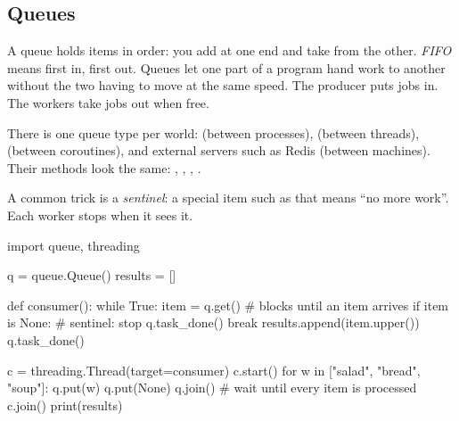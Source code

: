 \subsection{Queues}

A queue holds items in order: you add at one end and take from the other. \emph{FIFO} means first
in, first out. Queues let one part of a program hand work to another without the two having to
move at the same speed. The producer puts jobs in. The workers take jobs out when free.

\begin{center}
\end{center}

There is one queue type per world:  (between processes),
 (between threads),  (between coroutines), and external
servers such as Redis (between machines). Their methods look the same: , ,
, .

A common trick is a \emph{sentinel}: a special item such as  that means ``no more
work''. Each worker stops when it sees it.

\begin{pycode}
import queue, threading

q = queue.Queue()
results = []

def consumer():
    while True:
        item = q.get()                 # blocks until an item arrives
        if item is None:               # sentinel: stop
            q.task_done()
            break
        results.append(item.upper())
        q.task_done()

c = threading.Thread(target=consumer)
c.start()
for w in ["salad", "bread", "soup"]:
    q.put(w)
q.put(None)
q.join()                               # wait until every item is processed
c.join()
print(results)
\end{pycode}
\begin{rawcode}
\end{rawcode}

